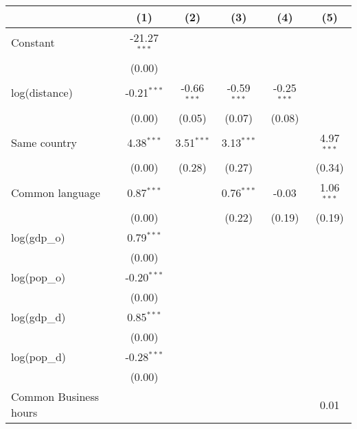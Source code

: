 
\begingroup
\centering
\small
\begin{tabular}{lccccc}
   \toprule
                            & (1)            & (2)           & (3)           & (4)           & (5)\\  
   \midrule 
   Constant                 & -21.27$^{***}$ &               &               &               &   \\   
                            & (0.00)         &               &               &               &   \\   
   log(distance)            & -0.21$^{***}$  & -0.66$^{***}$ & -0.59$^{***}$ & -0.25$^{***}$ &   \\   
                            & (0.00)         & (0.05)        & (0.07)        & (0.08)        &   \\   
   Same country             & 4.38$^{***}$   & 3.51$^{***}$  & 3.13$^{***}$  &               & 4.97$^{***}$\\   
                            & (0.00)         & (0.28)        & (0.27)        &               & (0.34)\\   
   Common language          & 0.87$^{***}$   &               & 0.76$^{***}$  & -0.03         & 1.06$^{***}$\\   
                            & (0.00)         &               & (0.22)        & (0.19)        & (0.19)\\   
   log(gdp\_o)              & 0.79$^{***}$   &               &               &               &   \\   
                            & (0.00)         &               &               &               &   \\   
   log(pop\_o)              & -0.20$^{***}$  &               &               &               &   \\   
                            & (0.00)         &               &               &               &   \\   
   log(gdp\_d)              & 0.85$^{***}$   &               &               &               &   \\   
                            & (0.00)         &               &               &               &   \\   
   log(pop\_d)              & -0.28$^{***}$  &               &               &               &   \\   
                            & (0.00)         &               &               &               &   \\   
   Common Business hours    &                &               &               &               & 0.01\\   

\end{tabular}
